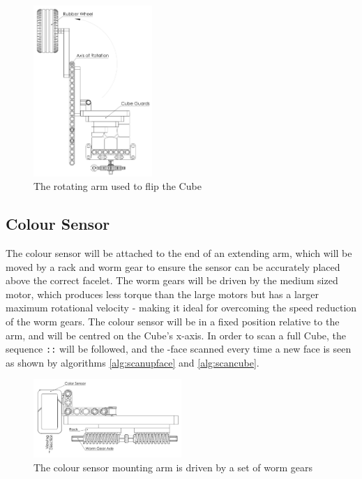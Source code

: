 \documentclass{report}
\newcommand{\movesequence}[1]{\uppercase{\texttt{:\formatmoves{#1}:}}}
\newcommand{\face}[1]{\uppercase{\texttt{\formatmovesnospace{#1}}}-face}
\begin{document}
    \begin{figure}[H]
    	\begin{center}
    		\includegraphics[width=0.4\textwidth]{Resources/Images/dwgRotatingArm.png}
    		\caption{The rotating arm used to flip the Cube}
    		\label{fig:dwgRotatingArm}
    	\end{center}
    \end{figure}
    
    
    \subsection{Colour Sensor}
    The colour sensor will be attached to the end of an extending arm, which will be moved by a rack and worm gear to ensure the sensor can be accurately placed above the correct facelet. The worm gears will be driven by the medium sized motor, which produces less torque than the large motors but has a larger maximum rotational velocity - making it ideal for overcoming the speed reduction of the worm gears. The colour sensor will be in a fixed position relative to the arm, and will be centred on the Cube's x-axis. In order to scan a full Cube, the sequence \movesequence{X.X.X.Y.X.X.X} will be followed, and the \face{u} scanned every time a new face is seen as shown by algorithms \ref{alg:scanupface} and \ref{alg:scancube}.
    
    \begin{figure}[H]
    	\begin{center}
    		\includegraphics[width=0.5\textwidth]{Resources/Images/dwgColorSensor.png}
    		\caption{The colour sensor mounting arm is driven by a set of worm gears}
    		\label{fig:dwgColorSensor}
    	\end{center}
    \end{figure}
    
\end{document}
